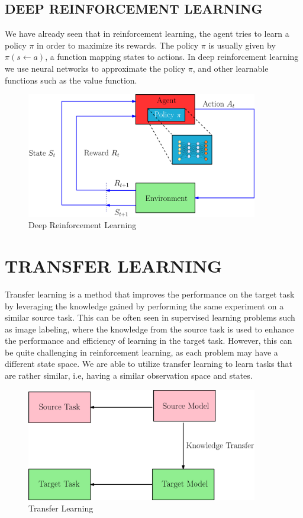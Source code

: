 \subsection{DEEP REINFORCEMENT LEARNING}

We have already seen that in reinforcement learning, the agent tries to learn a policy $\pi$ in order to maximize its rewards. The policy $\pi$ is usually given by $\pi(s\gets a)$, a function mapping states to actions. In deep reinforcement learning we use neural networks to approximate the policy $\pi$, and other learnable functions such as the value function.

\begin{figure}[H]
    \centering
    \includegraphics[width=0.9\textwidth]{images/drlv3.png}
    \caption{Deep Reinforcement Learning}
    \label{fig:rl}
\end{figure}

\section{TRANSFER LEARNING}


Transfer learning is a method that improves the performance on the target task by leveraging the knowledge gained by performing the same experiment on a similar source task. This can be often seen in supervised learning problems such as image labeling, where the knowledge from the source task is used to enhance the performance and efficiency of learning in the target task. However, this can be quite challenging in reinforcement learning, as each problem may have a different state space. We are able to utilize transfer learning to learn tasks that are rather similar, i.e, having a similar observation space and states.

\begin{figure}[H]
    \centering
    \includegraphics[width=0.9\textwidth]{images/tlv3.png}
    \caption{Transfer Learning}
    \label{fig:rl}
\end{figure}

